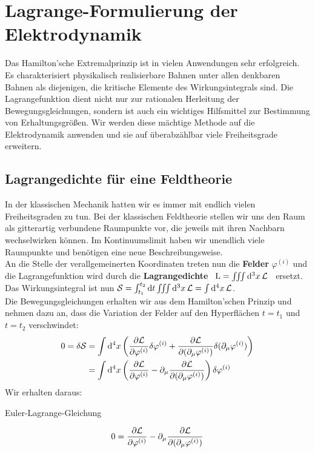 \section{Lagrange-Formulierung der Elektrodynamik}
Das Hamilton'sche Extremalprinzip ist in vielen Anwendungen sehr erfolgreich. Es charakterisiert physikalisch realisierbare Bahnen unter allen denkbaren Bahnen als diejenigen, die kritische Elemente des Wirkungsintegrals sind. Die Lagrangefunktion dient nicht nur zur rationalen Herleitung der Bewegungsgleichungen, sondern ist auch ein wichtiges Hilfsmittel zur Bestimmung von Erhaltungsgrößen.
Wir werden diese mächtige Methode auf die Elektrodynamik anwenden und sie auf überabzählbar viele Freiheitsgrade erweitern.

\subsection{Lagrangedichte für eine Feldtheorie}
In der klassischen Mechanik hatten wir es immer mit endlich vielen Freiheitsgraden zu tun. Bei der klassischen Feldtheorie stellen wir uns den Raum als gitterartig verbundene Raumpunkte vor, die jeweils mit ihren Nachbarn wechselwirken können. Im Kontinuumslimit haben wir unendlich viele Raumpunkte und benötigen eine neue Beschreibungsweise. \\
An die Stelle der verallgemeinerten Koordinaten treten nun die \textbf{Felder} $\varphi^{(i)}$ und die Lagrangefunktion wird durch die \textbf{Lagrangedichte} \  $\text{L}=\iiint \dd[3]{x}  \mathcal{L}$ \ ersetzt. \\
Das Wirkungsintegral ist nun $\mathcal{S}=\int_{t_1}^{t_2} \dd{t} \iiint \dd[3]{x}  \mathcal{L} = \int \dd[4]{x} \mathcal{L}$. \\
Die Bewegungsgleichungen erhalten wir aus dem Hamilton'schen Prinzip und nehmen dazu an, dass die Variation der Felder auf den Hyperflächen $t=t_1$ und $t=t_2$ verschwindet:
\begin{align*}
0 = \delta \mathcal{S} &= \int \dd[4]{x} \left( \frac{\partial\mathcal{L}}{\partial\varphi^{(i)}} \delta\varphi^{(i)} + \frac{\partial\mathcal{L}}{\partial(\partial_{\mu}\varphi^{(i)})} \delta(\partial_{\mu}\varphi^{(i)}) \right) \\
 				 &= \int \dd[4]{x} \left(\frac{\partial\mathcal{L}}{\partial\varphi^{(i)}} - \partial_{\mu} \frac{\partial\mathcal{L}}{\partial(\partial_{\mu}\varphi^{(i)})} \right) \delta\varphi^{(i)}
\end{align*}
Wir erhalten daraus:
\begin{mybox}{Euler-Lagrange-Gleichung}

\begin{align}
0=\frac{\partial\mathcal{L}}{\partial\varphi^{(i)}} - \partial_{\mu} \frac{\partial\mathcal{L}}{\partial(\partial_{\mu}\varphi^{(i)})}
\end{align}

\end{mybox}

